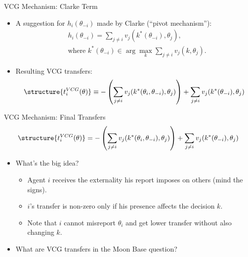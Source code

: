 \documentclass[english,10pt
,aspectratio=169
]{beamer}
\begin{document}
\begin{frame}{VCG Mechanism: Clarke Term}
\begin{itemize}
	\item A suggestion for $h_i(\theta_{-i})$ made by Clarke (``pivot mechanism''):
	\vspace{-0.5em}\begin{align*}
	&h_{i}(\theta_{-i})=\sum_{j\neq i} v_{j}(k^*(\theta_{-i}),\theta_{j}),
	\\ &\text{where } k^*(\theta_{-i}) \in \arg\max_{k} \sum_{j\neq i}v_{j}(k,\theta_{j}).
	\end{align*}
	\item Resulting \alert{VCG transfers}:
	\vspace{-0.5em}\begin{align*}
	\structure{ t_{i}^{VCG}(\theta) } \equiv -\left(\sum_{j\neq i} v_{j}(k^*(\theta_i, \theta_{-i}), \theta_{j}) \right) + \sum_{j\neq i} v_{j}(k^*(\theta_{-i}), \theta_{j})
	\end{align*}
\end{itemize}
\end{frame}


\begin{frame}{VCG Mechanism: Final Transfers}
\begin{align*}
\structure{ t_{i}^{VCG}(\theta) } = -\left(\sum_{j\neq i} v_{j}(k^*(\theta_i, \theta_{-i}), \theta_{j}) \right) + \sum_{j\neq i} v_{j}(k^*(\theta_{-i}), \theta_{j})
\end{align*}
\begin{itemize}
	\item What's the big idea?
	\begin{itemize}
		\item Agent $i$ receives the externality his report imposes on others (mind the signs).
		\item $i$'s transfer is non-zero only if his presence affects the decision $k$.
		\item Note that $i$ cannot misreport $\theta_i$ and get lower transfer without also changing $k$.
	\end{itemize}
	\item What are VCG transfers in the Moon Base question?
\end{itemize}
\end{frame}
\end{document}
